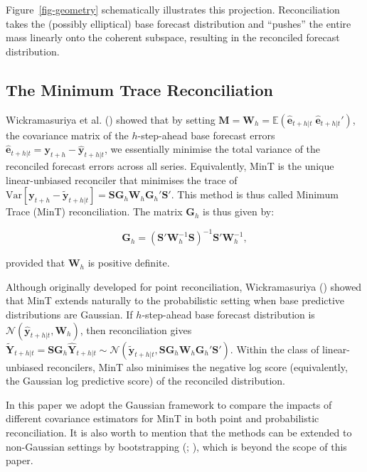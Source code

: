\documentclass[
  11pt,
  letterpaper,
  DIV=11,
  numbers=noendperiod,
  titlepage]{scrartcl}
\begin{document}
Figure~\ref{fig-geometry} schematically illustrates this projection.
Reconciliation takes the (possibly elliptical) base forecast
distribution and ``pushes'' the entire mass linearly onto the coherent
subspace, resulting in the reconciled forecast distribution.

\subsection{The Minimum Trace
Reconciliation}\label{the-minimum-trace-reconciliation}

Wickramasuriya et al. ()
showed that by setting
\(\boldsymbol{M} = \boldsymbol{W}_h = \mathbb{E}( \hat{\boldsymbol{e}}_{t+h|t} \; \hat{\boldsymbol{e}}_{t+h|t}' )\),
the covariance matrix of the \(h\)-step-ahead base forecast errors
\(\hat{\boldsymbol{e}}_{t+h|t} = \boldsymbol{y}_{t+h} - \hat{\boldsymbol{y}}_{t+h|t}\),
we essentially minimise the total variance of the reconciled forecast
errors across all series. Equivalently, MinT is the unique
linear-unbiased reconciler that minimises the trace of
\(\text{Var}[\boldsymbol{y}_{t+h} - \tilde{\boldsymbol{y}}_{t+h|t}] = \boldsymbol{S} \boldsymbol{G}_h \boldsymbol{W}_h \boldsymbol{G}_h' \boldsymbol{S}'\).
This method is thus called Minimum Trace (MinT) reconciliation. The
matrix \(\boldsymbol{G}_h\) is thus given by:

\[
\boldsymbol{G}_h = (\boldsymbol{S}' \boldsymbol{W}_h^{-1} \boldsymbol{S})^{-1}
\boldsymbol{S}' \boldsymbol{W}_h^{-1},
\]

provided that \(\boldsymbol{W}_h\) is positive definite.

Although originally developed for point reconciliation, Wickramasuriya
() showed that MinT extends
naturally to the probabilistic setting when base predictive
distributions are Gaussian. If \(h\)-step-ahead base forecast
distribution is
\(\mathcal{N}(\hat{\boldsymbol{y}}_{t+h|t}, \boldsymbol{W}_h)\), then
reconciliation gives
\(\tilde{\boldsymbol{Y}}_{t+h|t} = \boldsymbol{S} \boldsymbol{G}_h \hat{\boldsymbol{Y}}_{t+h|t} \sim \mathcal{N}(\tilde{\boldsymbol{y}}_{t+h|t}, \boldsymbol{S} \boldsymbol{G}_h \boldsymbol{W}_h \boldsymbol{G}_h' \boldsymbol{S}')\).
Within the class of linear-unbiased reconcilers, MinT also minimises the
negative log score (equivalently, the Gaussian log predictive score) of
the reconciled distribution.

In this paper we adopt the Gaussian framework to compare the impacts of
different covariance estimators for MinT in both point and probabilistic
reconciliation. It is also worth to mention that the methods can be
extended to non-Gaussian settings by bootstrapping
(;
), which is
beyond the scope of this paper.
\end{document}
